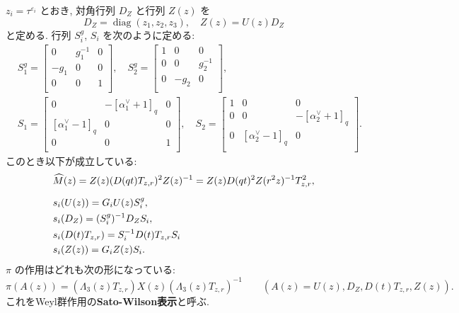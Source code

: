 \documentclass[12pt,twoside,dvipdfm]{msjproc}
\theoremstyle{definition} %
\theoremstyle{definition} %
\theoremstyle{definition} %
\numberwithin{theorem}{section}
\numberwithin{equation}{section}
\numberwithin{figure}{section}
\numberwithin{table}{section}
\newcommand\eps{\varepsilon}
\newcommand\diag{\mathop{\mathrm{diag}}\nolimits}
\newcommand\hM{{\widehat{M}}}
\newcommand\av{\alpha^\vee}
\begin{document}
$z_i=\tau^{\eps_i}$ とおき, 対角行列 $D_Z$ と行列 $Z(z)$ を
\begin{equation*}
  D_Z=\diag(z_1,z_2,z_3), \quad Z(z) = U(z)D_Z
\end{equation*} 
と定める. 行列 $S^g_i$, $S_i$ を次のように定める:
\begin{align*}
 &
 S^g_1 =
 \begin{bmatrix}
   0    & g_1^{-1} & 0 \\
   -g_1 & 0        & 0 \\
   0    & 0        & 1 \\
 \end{bmatrix},
 \quad
 S^g_2 =
 \begin{bmatrix}
   1 & 0 & 0 \\
   0 & 0 & g_2^{-1} \\
   0 & -g_2 & 0 \\
 \end{bmatrix},
 \\ &
 S_1 =
 \begin{bmatrix}
   0           & -[\av_1+1]_q & 0 \\
   [\av_1-1]_q & 0        & 0 \\
   0           & 0        & 1 \\
 \end{bmatrix},
 \quad
 S_2 =
 \begin{bmatrix}
   1 & 0           & 0 \\
   0 & 0           & -[\av_2+1]_q \\
   0 & [\av_2-1]_q & 0 \\
 \end{bmatrix}.
\end{align*}
このとき以下が成立している:
\begin{align*}
 &
 \hM(z)
 = Z(z)(D(qt)T_{z,r})^2 Z(z)^{-1}
 = Z(z)D(qt)^2Z(r^2z)^{-1}T_{z,r}^2,
 \\[\medskipamount] &
 s_i(U(z)) = G_i U(z) S^g_i, 
 \\ &
 s_i(D_Z) = (S^g_i)^{-1} D_Z S_i, \
 \\ &
 s_i(D(t)T_{z,r}) = S_i^{-1} D(t)T_{z,r} S_i
 \\ &
 s_i(Z(z)) = G_i Z(z) S_i.
\end{align*}
$\pi$ の作用はどれも次の形になっている:
\begin{equation*}
  \pi(A(z)) = (\Lambda_3(z)T_{z,r})X(z)(\Lambda_3(z)T_{z,r})^{-1} \qquad
  (A(z)=U(z),D_Z,D(t)T_{z,r},Z(z)).
\end{equation*}
これをWeyl群作用の{\bf Sato-Wilson表示}と呼ぶ.
\end{document}
